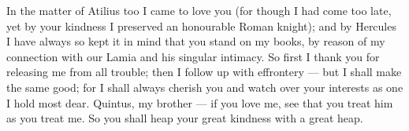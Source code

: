 

In the matter of Atilius too I came to love you (for though I had come too late, yet by your kindness I preserved an honourable Roman knight); and by Hercules I have always so kept it in mind that you stand on my books, by reason of my connection with our Lamia and his singular intimacy. So first I thank you for releasing me from all trouble; then I follow up with effrontery --- but I shall make the same good; for I shall always cherish you and watch over your interests as one I hold most dear. Quintus, my brother --- if you love me, see that you treat him as you treat me. So you shall heap your great kindness with a great heap.
